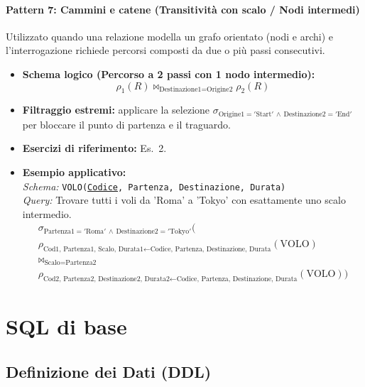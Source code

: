 \documentclass[12pt]{extarticle}
\begin{document}
\paragraph{Pattern 7: Cammini e catene (Transitività con scalo / Nodi intermedi)}
Utilizzato quando una relazione modella un grafo orientato (nodi e archi) e l'interrogazione richiede percorsi composti da due o più passi consecutivi.
\begin{itemize}
    \item \textbf{Schema logico (Percorso a 2 passi con 1 nodo intermedio):}
    \[
    \rho_1(R) \bowtie_{\text{Destinazione1} = \text{Origine2}} \rho_2(R)
    \]
    \item \textbf{Filtraggio estremi:} applicare la selezione $\sigma_{\text{Origine1} = '\text{Start}' \,\land\, \text{Destinazione2} = '\text{End}'}$ per bloccare il punto di partenza e il traguardo.
    \item \textbf{Esercizi di riferimento:} Es.~2.
    \item \textbf{Esempio applicativo:}\\
    \textit{Schema:} \texttt{VOLO(\underline{Codice}, Partenza, Destinazione, Durata)}\\
    \textit{Query:} Trovare tutti i voli da 'Roma' a 'Tokyo' con esattamente uno scalo intermedio.
    \[
    \begin{gathered}
    \sigma_{\text{Partenza1} = '\text{Roma}' \,\land\, \text{Destinazione2} = '\text{Tokyo}'} \Big( \\
    \rho_{\text{Cod1, Partenza1, Scalo, Durata1} \leftarrow \text{Codice, Partenza, Destinazione, Durata}}(\text{VOLO}) \\
    \bowtie_{\text{Scalo} = \text{Partenza2}} \\
    \rho_{\text{Cod2, Partenza2, Destinazione2, Durata2} \leftarrow \text{Codice, Partenza, Destinazione, Durata}}(\text{VOLO}) \Big)
    \end{gathered}
    \]
\end{itemize}

\newpage

\section{SQL di base}

\subsection{Definizione dei Dati (DDL)}
\end{document}
